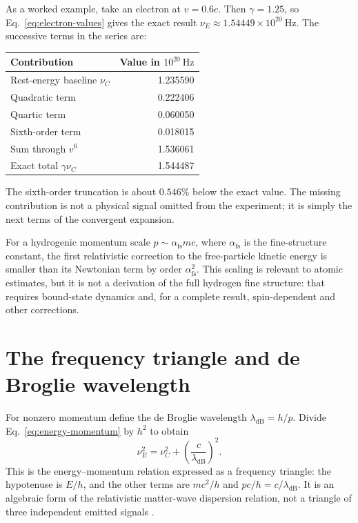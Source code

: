 \documentclass[12pt]{article}
\begin{document}
As a worked example, take an electron at $v=0.6c$. Then $\gamma=1.25$, so Eq.~\eqref{eq:electron-values} gives the exact result $\nu_E\approx1.54449\times10^{20}\ \mathrm{Hz}$. The successive terms in the series are:
\begin{center}
\begin{tabular}{lr}
  \toprule
  Contribution & Value in $10^{20}\ \mathrm{Hz}$ \\
  \midrule
  Rest-energy baseline $\nu_C$ & 1.235590 \\
  Quadratic term & 0.222406 \\
  Quartic term & 0.060050 \\
  Sixth-order term & 0.018015 \\
  Sum through $v^6$ & 1.536061 \\
  Exact total $\gamma\nu_C$ & 1.544487 \\
  \bottomrule
\end{tabular}
\end{center}
The sixth-order truncation is about $0.546\%$ below the exact value. The missing contribution is not a physical signal omitted from the experiment; it is simply the next terms of the convergent expansion.

For a hydrogenic momentum scale $p\sim\alpha_{\mathrm{fs}} mc$, where $\alpha_{\mathrm{fs}}$ is the fine-structure constant, the first relativistic correction to the free-particle kinetic energy is smaller than its Newtonian term by order $\alpha_{\mathrm{fs}}^2$. This scaling is relevant to atomic estimates, but it is not a derivation of the full hydrogen fine structure: that requires bound-state dynamics and, for a complete result, spin-dependent and other corrections.

\section{The frequency triangle and de Broglie wavelength}

For nonzero momentum define the de Broglie wavelength $\lambda_{\mathrm{dB}}=h/p$. Divide Eq.~\eqref{eq:energy-momentum} by $h^2$ to obtain
\begin{equation}
  \boxed{\nu_E^2=\nu_C^2+\left(\frac{c}{\lambda_{\mathrm{dB}}}\right)^2.}
  \label{eq:frequency-triangle}
\end{equation}
This is the energy--momentum relation expressed as a frequency triangle: the hypotenuse is $E/h$, and the other terms are $mc^2/h$ and $pc/h=c/\lambda_{\mathrm{dB}}$. It is an algebraic form of the relativistic matter-wave dispersion relation, not a triangle of three independent emitted signals \cite{deBroglie}.
\end{document}
